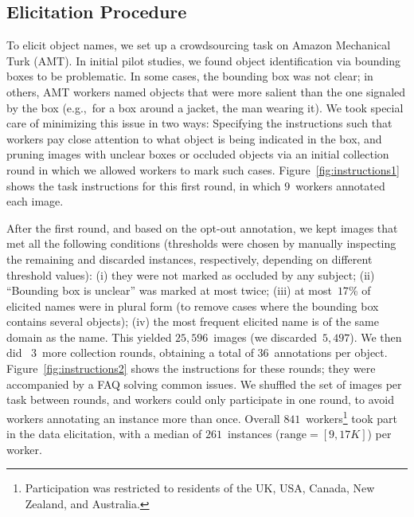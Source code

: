 \subsection{Elicitation Procedure}
\label{ssec:elicitation}

To elicit object names, we set up a crowdsourcing task on Amazon Mechanical Turk (AMT).
In initial pilot studies, we found object identification via bounding boxes to be problematic.
In some cases, the bounding box was not clear; in others, AMT workers named objects that were more salient than the one signaled by the box (e.g.,~for a box around a jacket, the man wearing it).
We took special care of minimizing this issue in two ways: Specifying the instructions such that workers pay close attention to what object is being indicated in the box, and pruning images with unclear boxes or occluded objects via an initial collection round in which we allowed workers to mark such cases.
Figure~\ref{fig:instructions1} shows the task instructions for this first round, in which $9$~workers annotated each image.

After the first round, and based on the opt-out annotation, we kept images that met all the following conditions (thresholds were chosen by manually inspecting the remaining and discarded instances, respectively, depending on different threshold values): (i) they were not marked as occluded by any subject; (ii) ``Bounding box is unclear'' was marked at most twice; (iii) at most~$17$\% of elicited names were in plural form (to remove cases where the bounding box contains several objects); (iv) the most frequent elicited name is of the same domain as the \vg name.
This yielded $25,596$~images (we discarded~$5,497$).
We then did ~3~more collection rounds, obtaining a total of $36$~annotations per object.
Figure~\ref{fig:instructions2} shows the instructions for these rounds; they were accompanied by a FAQ solving common issues. 
We shuffled the set of images per task between rounds, and workers could only participate in one round, to avoid workers annotating an instance more than once.
Overall $841$~workers\footnote{Participation was restricted to residents of the UK, USA, Canada, New Zealand, and Australia.} took part in the data elicitation, with a median of  $261$~instances \mbox{($\textrm{range}=[9,17K]$)} per worker.


